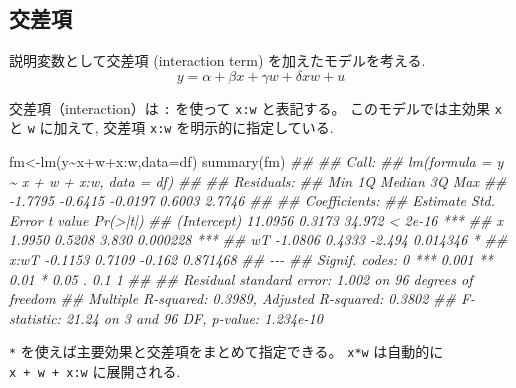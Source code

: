 \documentclass[
  letterpaper,
  xelatex,
  ja=standard, xelatex]{bxjsbook}
\newenvironment{Shaded}{\begin{snugshade}}{\end{snugshade}}
\newcommand{\AttributeTok}[1]{\textcolor[rgb]{0.40,0.45,0.13}{#1}}
\newcommand{\DocumentationTok}[1]{\textcolor[rgb]{0.37,0.37,0.37}{\textit{#1}}}
\newcommand{\FunctionTok}[1]{\textcolor[rgb]{0.28,0.35,0.67}{#1}}
\newcommand{\NormalTok}[1]{\textcolor[rgb]{0.00,0.23,0.31}{#1}}
\newcommand{\OtherTok}[1]{\textcolor[rgb]{0.00,0.23,0.31}{#1}}
\newcommand{\SpecialCharTok}[1]{\textcolor[rgb]{0.37,0.37,0.37}{#1}}
\begin{document}
\subsection{交差項}\label{ux4ea4ux5deeux9805}

説明変数として交差項 (interaction term) を加えたモデルを考える. \[
y = \alpha + \beta x + \gamma w + \delta xw + u
\]

交差項（interaction）は \texttt{:} を使って \texttt{x:w} と表記する。
このモデルでは主効果 \texttt{x} と \texttt{w} に加えて, 交差項
\texttt{x:w} を明示的に指定している.

\begin{Shaded}
\begin{Highlighting}[]
\NormalTok{fm}\OtherTok{\textless{}{-}}\FunctionTok{lm}\NormalTok{(y}\SpecialCharTok{\textasciitilde{}}\NormalTok{x}\SpecialCharTok{+}\NormalTok{w}\SpecialCharTok{+}\NormalTok{x}\SpecialCharTok{:}\NormalTok{w,}\AttributeTok{data=}\NormalTok{df)}
\FunctionTok{summary}\NormalTok{(fm)}
\DocumentationTok{\#\# }
\DocumentationTok{\#\# Call:}
\DocumentationTok{\#\# lm(formula = y \textasciitilde{} x + w + x:w, data = df)}
\DocumentationTok{\#\# }
\DocumentationTok{\#\# Residuals:}
\DocumentationTok{\#\#     Min      1Q  Median      3Q     Max }
\DocumentationTok{\#\# {-}1.7795 {-}0.6415 {-}0.0197  0.6003  2.7746 }
\DocumentationTok{\#\# }
\DocumentationTok{\#\# Coefficients:}
\DocumentationTok{\#\#             Estimate Std. Error t value Pr(\textgreater{}|t|)    }
\DocumentationTok{\#\# (Intercept)  11.0956     0.3173  34.972  \textless{} 2e{-}16 ***}
\DocumentationTok{\#\# x             1.9950     0.5208   3.830 0.000228 ***}
\DocumentationTok{\#\# wT           {-}1.0806     0.4333  {-}2.494 0.014346 *  }
\DocumentationTok{\#\# x:wT         {-}0.1153     0.7109  {-}0.162 0.871468    }
\DocumentationTok{\#\# {-}{-}{-}}
\DocumentationTok{\#\# Signif. codes:  0 \textquotesingle{}***\textquotesingle{} 0.001 \textquotesingle{}**\textquotesingle{} 0.01 \textquotesingle{}*\textquotesingle{} 0.05 \textquotesingle{}.\textquotesingle{} 0.1 \textquotesingle{} \textquotesingle{} 1}
\DocumentationTok{\#\# }
\DocumentationTok{\#\# Residual standard error: 1.002 on 96 degrees of freedom}
\DocumentationTok{\#\# Multiple R{-}squared:  0.3989, Adjusted R{-}squared:  0.3802 }
\DocumentationTok{\#\# F{-}statistic: 21.24 on 3 and 96 DF,  p{-}value: 1.234e{-}10}
\end{Highlighting}
\end{Shaded}

\texttt{*} を使えば主要効果と交差項をまとめて指定できる。 \texttt{x*w}
は自動的に \texttt{x\ +\ w\ +\ x:w} に展開される.
\end{document}
